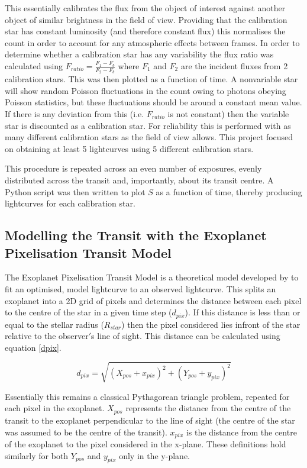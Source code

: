\documentclass{report}
\begin{document}
This essentially calibrates the flux from the object of interest against another object of similar brightness in the field of view. Providing that the calibration star has constant luminosity (and therefore constant flux) this normalises the count in order to account for any atmospheric effects between frames. In order to determine whether a calibration star has any variability the flux ratio was calculated using $F_{ratio} = \frac{F_{1} - F_{b}}{F_{2}-F_{b}}$ where $F_{1}$ and $F_{2}$ are the incident fluxes from 2 calibration stars. This was then plotted as a function of time. A nonvariable star will show random Poisson fluctuations in the count owing to photons obeying Poisson statistics, but these fluctuations should be around a constant mean value. If there is any deviation from this (i.e. $F_{ratio}$ is not constant) then the variable star is discounted as a calibration star. For reliability this is performed with as many different calibration stars as the field of view allows. This project focused on obtaining at least 5 lightcurves using 5 different calibration stars. 

This procedure is repeated across an even number of exposures, evenly distributed across the transit and, importantly, about its transit centre. A Python script was then written to plot $S$ as a function of time, thereby producing lightcurves for each calibration star.

\subsection{Modelling the Transit with the Exoplanet Pixelisation Transit Model}
The Exoplanet Pixelisation Transit Model is a theoretical model developed by \textcite{model} to fit an optimised, model lightcurve to an observed lightcurve. This splits an exoplanet into a 2D grid of pixels and determines the distance between each pixel to the centre of the star in a given time step ($d_{pix}$). If this distance is less than or equal to the stellar radius ($R_{star}$) then the pixel considered lies infront of the star relative to the observer$'$s line of sight. This distance can be calculated using equation \ref{dpix}.

\begin{equation} \label{dpix}
    d_{pix} = \sqrt{(X_{pos} + x_{pix})^2 + (Y_{pos} + y_{pix})^2}
\end{equation}

Essentially this remains a classical Pythagorean triangle problem, repeated for each pixel in the exoplanet. $X_{pos}$ represents the distance from the centre of the transit to the exoplanet perpendicular to the line of sight (the centre of the star was assumed to be the centre of the transit). $x_{pix}$ is the distance from the centre of the exoplanet to the pixel considered in the x-plane. These definitions hold similarly for both $Y_{pos}$ and $y_{pix}$ only in the y-plane.
\end{document}
